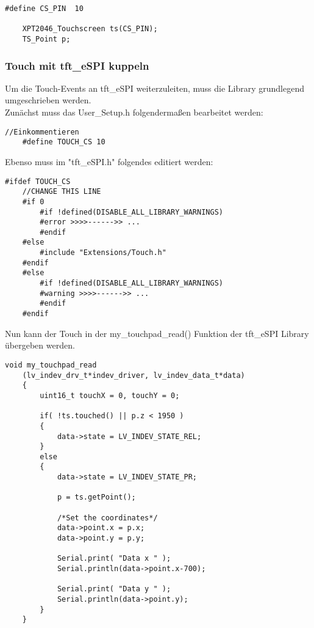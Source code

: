 \begin{lstlisting}[style=cppCode]
    #define CS_PIN  10

    XPT2046_Touchscreen ts(CS_PIN);
    TS_Point p;
\end{lstlisting}

            \subsubsection{Touch mit tft\_eSPI kuppeln} \label{touch_to_tft}
            Um die Touch-Events an tft\_eSPI weiterzuleiten, muss die Library grundlegend \\ 
            umgeschrieben werden.\\
            Zunächst muss das User\_Setup.h folgendermaßen bearbeitet werden:

\begin{lstlisting}[style=cppCode]
    //Einkommentieren
    #define TOUCH_CS 10 
\end{lstlisting}

            
            \begin{minipage}{\linewidth}
            Ebenso muss im "tft\_eSPI.h" folgendes editiert werden:
\begin{lstlisting}[style=cppCode]
    #ifdef TOUCH_CS
    //CHANGE THIS LINE
    #if 0
        #if !defined(DISABLE_ALL_LIBRARY_WARNINGS)
        #error >>>>------>> ...
        #endif
    #else
        #include "Extensions/Touch.h"
    #endif
    #else
        #if !defined(DISABLE_ALL_LIBRARY_WARNINGS)
        #warning >>>>------>> ...
        #endif
    #endif
\end{lstlisting}\end{minipage}
            
            

            \begin{minipage}{\linewidth}
            Nun kann der Touch in der my\_touchpad\_read() Funktion der tft\_eSPI Library
            übergeben werden.
            \begin{lstlisting}[style=cppCode]
    void my_touchpad_read
    (lv_indev_drv_t*indev_driver, lv_indev_data_t*data)
    {
        uint16_t touchX = 0, touchY = 0;
    
        if( !ts.touched() || p.z < 1950 )
        {
            data->state = LV_INDEV_STATE_REL;
        }
        else
        {
            data->state = LV_INDEV_STATE_PR;
    
            p = ts.getPoint();

            /*Set the coordinates*/
            data->point.x = p.x;
            data->point.y = p.y;
    
            Serial.print( "Data x " );
            Serial.println(data->point.x-700);
    
            Serial.print( "Data y " );
            Serial.println(data->point.y);
        }
    }
            \end{lstlisting}\end{minipage}

